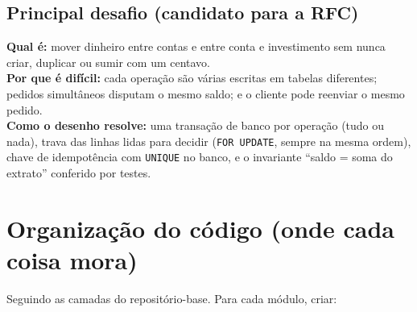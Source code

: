 \documentclass[11pt,a4paper]{article}
\newcommand{\tb}[1]{\texttt{#1}}           %
\begin{document}
\subsection*{Principal desafio (candidato para a RFC)}

\textbf{Qual é:} mover dinheiro entre contas e entre conta e investimento sem nunca criar,
duplicar ou sumir com um centavo.\\
\textbf{Por que é difícil:} cada operação são várias escritas em tabelas diferentes; pedidos
simultâneos disputam o mesmo saldo; e o cliente pode reenviar o mesmo pedido.\\
\textbf{Como o desenho resolve:} uma transação de banco por operação (tudo ou nada), trava das
linhas lidas para decidir (\tb{FOR UPDATE}, sempre na mesma ordem), chave de idempotência com
\tb{UNIQUE} no banco, e o invariante ``saldo = soma do extrato'' conferido por testes.

\section{Organização do código (onde cada coisa mora)}

Seguindo as camadas do repositório-base. Para cada módulo, criar:
\end{document}
